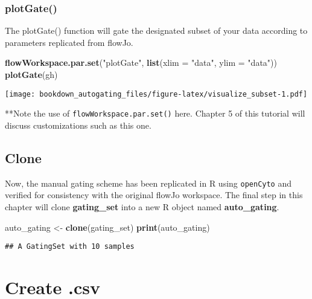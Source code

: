 \documentclass[]{book}
\newenvironment{Shaded}{\begin{snugshade}}{\end{snugshade}}
\newcommand{\DataTypeTok}[1]{\textcolor[rgb]{0.13,0.29,0.53}{#1}}
\newcommand{\KeywordTok}[1]{\textcolor[rgb]{0.13,0.29,0.53}{\textbf{#1}}}
\newcommand{\NormalTok}[1]{#1}
\newcommand{\StringTok}[1]{\textcolor[rgb]{0.31,0.60,0.02}{#1}}
\begin{document}
\hypertarget{plotgate}{%
\subsection{plotGate()}\label{plotgate}}

The plotGate() function will gate the designated subset of your data according to parameters replicated from flowJo.

\begin{Shaded}
\begin{Highlighting}[]
\KeywordTok{flowWorkspace.par.set}\NormalTok{(}\StringTok{"plotGate"}\NormalTok{, }\KeywordTok{list}\NormalTok{(}\DataTypeTok{xlim =} \StringTok{"data"}\NormalTok{,}
                                       \DataTypeTok{ylim =} \StringTok{"data"}\NormalTok{))}
\KeywordTok{plotGate}\NormalTok{(gh)}
\end{Highlighting}
\end{Shaded}

\texttt{[image: bookdown\_autogating\_files/figure-latex/visualize\_subset-1.pdf]}

**Note the use of \texttt{flowWorkspace.par.set()} here. Chapter 5 of this tutorial will discuss customizations such as this one.

\hypertarget{clone}{%
\section{Clone}\label{clone}}

Now, the manual gating scheme has been replicated in R using \texttt{openCyto} and verified for consistency with the original flowJo workspace. The final step in this chapter will clone \textbf{gating\_set} into a new R object named \textbf{auto\_gating}.

\begin{Shaded}
\begin{Highlighting}[]
\NormalTok{auto_gating <-}\StringTok{ }\KeywordTok{clone}\NormalTok{(gating_set)}
\KeywordTok{print}\NormalTok{(auto_gating)}
\end{Highlighting}
\end{Shaded}

\begin{verbatim}
## A GatingSet with 10 samples
\end{verbatim}

\hypertarget{create-.csv}{%
\chapter{Create .csv}\label{create-.csv}}
\end{document}
